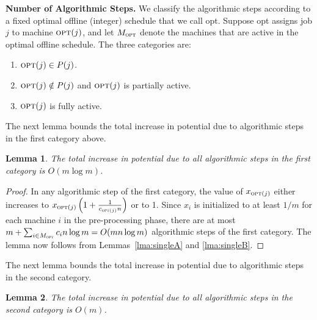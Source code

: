 \documentclass[11pt]{article}
\newcommand{\opt}{{\text{\sc opt}}}
\newtheorem{lemma}{Lemma}
\begin{document}
\noindent
{\bf Number of Algorithmic Steps.}
We classify the algorithmic steps according to a fixed 
optimal offline (integer) schedule that we call {\sc opt}. Suppose {\sc opt}
assigns job $j$ to machine $\opt (j)$, and let $M_{\opt}$ denote the machines
that are active in the optimal offline schedule. The three categories are:
\begin{enumerate}
\item $\opt (j) \in P(j)$.
\item $\opt (j) \notin P(j)$ and $\opt (j)$ is partially active.
\item $\opt (j)$ is fully active.
\end{enumerate}
The next lemma bounds the total increase in potential due to algorithmic 
steps in the first category above.
\begin{lemma}
\label{lma:category1}
The total increase in potential due to all algorithmic steps in the first 
category is $O(m \log m)$.
\end{lemma}
\begin{proof}
In any algorithmic step of the first category, the value of $x_{\opt (j)}$
either increases to $x_{\opt (j)}\left(1 + \frac{1}{c_{\opt (j)} n}\right)$ or to 1. 
Since $x_i$ is initialized
to at least $1/m$ for each machine $i$ in the pre-processing phase, 
there are at most 
$m + \sum_{i\in M_{\opt}} c_i n\log m = O(m n\log m)$ 
algorithmic steps of the first category.
The lemma now follows from Lemmas~\ref{lma:singleA} and \ref{lma:singleB}.
\end{proof}
\noindent
The next lemma bounds the total increase in potential due to algorithmic 
steps in the second category.
\begin{lemma}
\label{lma:category2}
The total increase in potential due to all algorithmic steps in the second 
category is $O(m)$.
\end{lemma}
\end{document}
